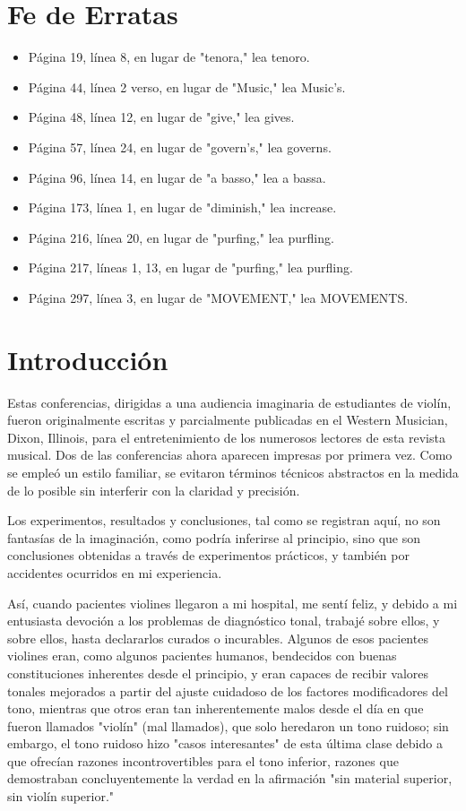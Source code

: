 \documentclass[12pt]{book}
\begin{document}
\chapter*{Fe de Erratas}

\begin{itemize}
    \item Página 19, línea 8, en lugar de "tenora," lea tenoro.
    \item Página 44, línea 2 verso, en lugar de "Music," lea Music's.
    \item Página 48, línea 12, en lugar de "give," lea gives.
    \item Página 57, línea 24, en lugar de "govern's," lea governs.
    \item Página 96, línea 14, en lugar de "a basso," lea a bassa.
    \item Página 173, línea 1, en lugar de "diminish," lea increase.
    \item Página 216, línea 20, en lugar de "purfing," lea purfling.
    \item Página 217, líneas 1, 13, en lugar de "purfing," lea purfling.
    \item Página 297, línea 3, en lugar de "MOVEMENT," lea MOVEMENTS.
\end{itemize}

\chapter*{Introducción}

Estas conferencias, dirigidas a una audiencia imaginaria de estudiantes de violín, fueron originalmente escritas y parcialmente publicadas en el Western Musician, Dixon, Illinois, para el entretenimiento de los numerosos lectores de esta revista musical. Dos de las conferencias ahora aparecen impresas por primera vez. Como se empleó un estilo familiar, se evitaron términos técnicos abstractos en la medida de lo posible sin interferir con la claridad y precisión.

Los experimentos, resultados y conclusiones, tal como se registran aquí, no son fantasías de la imaginación, como podría inferirse al principio, sino que son conclusiones obtenidas a través de experimentos prácticos, y también por accidentes ocurridos en mi experiencia.

Así, cuando pacientes violines llegaron a mi hospital, me sentí feliz, y debido a mi entusiasta devoción a los problemas de diagnóstico tonal, trabajé sobre ellos, y sobre ellos, hasta declararlos curados o incurables. Algunos de esos pacientes violines eran, como algunos pacientes humanos, bendecidos con buenas constituciones inherentes desde el principio, y eran capaces de recibir valores tonales mejorados a partir del ajuste cuidadoso de los factores modificadores del tono, mientras que otros eran tan inherentemente malos desde el día en que fueron llamados "violín" (mal llamados), que solo heredaron un tono ruidoso; sin embargo, el tono ruidoso hizo "casos interesantes" de esta última clase debido a que ofrecían razones incontrovertibles para el tono inferior, razones que demostraban concluyentemente la verdad en la afirmación "sin material superior, sin violín superior."
\end{document}
